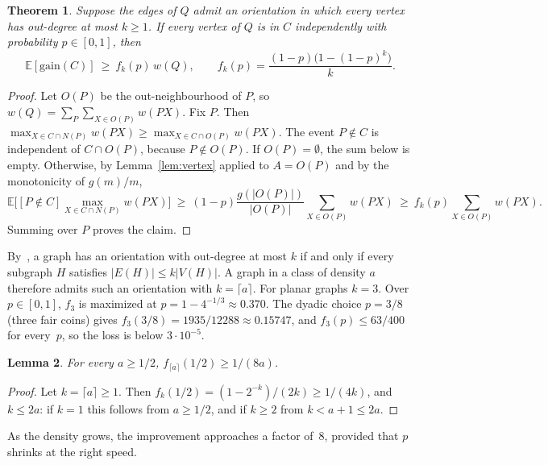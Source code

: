 \documentclass[11pt]{article}
\newtheorem{theorem}{Theorem}
\newtheorem{lemma}[theorem]{Lemma}
\theoremstyle{remark}
\newcommand{\E}{\mathbb{E}}
\begin{document}
\begin{theorem}\label{thm:level}
Suppose the edges of $Q$ admit an orientation in which every vertex has out-degree at most $k\ge1$.
If every vertex of $Q$ is in $C$ independently with probability $p\in[0,1]$, then
\[
  \E[\mathrm{gain}(C)]\ \ge\ f_k(p)\,w(Q),\qquad f_k(p)=\frac{(1-p)\big(1-(1-p)^k\big)}{k}.
\]
\end{theorem}
\begin{proof}
Let $O(P)$ be the out-neighbourhood of $P$, so $w(Q)=\sum_P\sum_{X\in O(P)}w(PX)$. Fix $P$. Then
$\max_{X\in C\cap N(P)}w(PX)\ge\max_{X\in C\cap O(P)}w(PX)$. The event $P\notin C$ is independent
of $C\cap O(P)$, because $P\notin O(P)$. If $O(P)=\emptyset$, the sum below is empty. Otherwise,
by Lemma~\ref{lem:vertex} applied to $A=O(P)$ and by the monotonicity of $g(m)/m$,
\[
  \E\Big[[P\notin C]\max_{X\in C\cap N(P)}w(PX)\Big]\ \ge\ (1-p)\frac{g(|O(P)|)}{|O(P)|}\sum_{X\in O(P)}w(PX)
  \ \ge\ f_k(p)\sum_{X\in O(P)}w(PX).
\]
Summing over $P$ proves the claim.
\end{proof}

By~\cite{H65}, a graph has an orientation with out-degree at most $k$ if and only if every
subgraph $H$ satisfies $|E(H)|\le k|V(H)|$. A graph in a class of density $a$ therefore admits such
an orientation with $k=\lceil a\rceil$. For planar graphs $k=3$. Over $p\in[0,1]$, $f_3$ is maximized at
$p=1-4^{-1/3}\approx0.370$. The dyadic choice $p=3/8$ (three fair coins) gives
$f_3(3/8)=1935/12288\approx0.15747$, and $f_3(p)\le 63/400$ for every~$p$, so the loss is below $3\cdot10^{-5}$.

\begin{lemma}\label{lem:dominates}
For every $a\ge1/2$, $f_{\lceil a\rceil}(1/2)\ge 1/(8a)$.
\end{lemma}
\begin{proof}
Let $k=\lceil a\rceil\ge1$. Then $f_k(1/2)=(1-2^{-k})/(2k)\ge 1/(4k)$, and $k\le 2a$: if $k=1$ this
follows from $a\ge1/2$, and if $k\ge2$ from $k<a+1\le 2a$.
\end{proof}

As the density grows, the improvement approaches a factor of~$8$, provided that $p$ shrinks at the
right speed.
\end{document}
